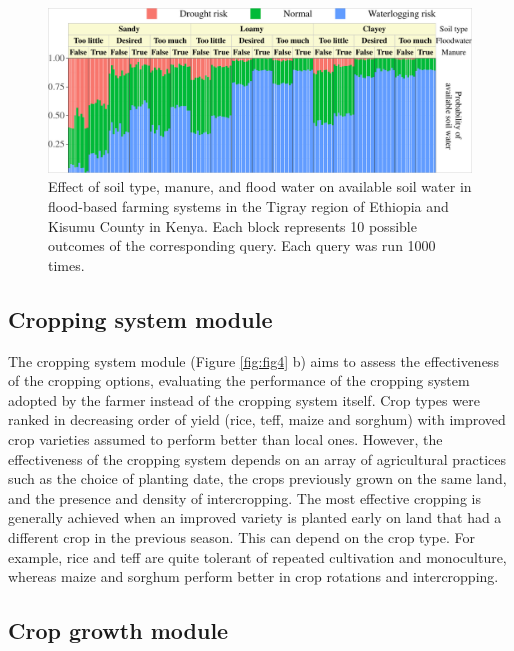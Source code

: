 \documentclass[]{elsarticle} %
\begin{document}
\begin{figure}[!h]

{\centering \includegraphics[width=1\linewidth,]{figures/Modelling_FBFS_factor_of_soil_water} 

}

\caption{Effect of soil type, manure, and flood water on available soil water in flood-based farming systems in the Tigray region of Ethiopia and Kisumu County in Kenya. Each block represents 10 possible outcomes of the corresponding query. Each query was run 1000 times.}\label{fig:fig6}
\end{figure}

\hypertarget{ref43}{%
\subsection{Cropping system module}\label{ref43}}

The cropping system module (Figure \ref{fig:fig4} b) aims to assess the effectiveness of the cropping options, evaluating the performance of the cropping system adopted by the farmer instead of the cropping system itself. Crop types were ranked in decreasing order of yield (rice, teff, maize and sorghum) with improved crop varieties assumed to perform better than local ones. However, the effectiveness of the cropping system depends on an array of agricultural practices such as the choice of planting date, the crops previously grown on the same land, and the presence and density of intercropping. The most effective cropping is generally achieved when an improved variety is planted early on land that had a different crop in the previous season. This can depend on the crop type. For example, rice and teff are quite tolerant of repeated cultivation and monoculture, whereas maize and sorghum perform better in crop rotations and intercropping.

\hypertarget{ref44}{%
\subsection{Crop growth module}\label{ref44}}
\end{document}
